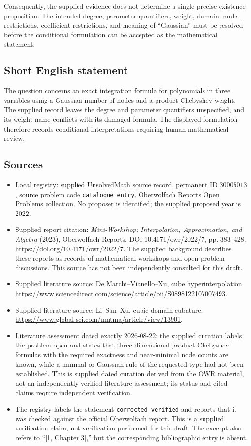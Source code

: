 \documentclass[11pt]{article}
\begin{document}
Consequently, the supplied evidence does not determine a single precise existence proposition. The intended degree, parameter quantifiers, weight, domain, node restrictions, coefficient restrictions, and meaning of ``Gaussian'' must be resolved before the conditional formulation can be accepted as the mathematical statement.
\subsection{Short English statement}
The question concerns an exact integration formula for polynomials in three variables using a Gaussian number of nodes and a product Chebyshev weight. The supplied record leaves the degree and parameter quantifiers unspecified, and its weight name conflicts with its damaged formula. The displayed formulation therefore records conditional interpretations requiring human mathematical review.
\subsection{Sources}
\begin{itemize}
\item Local registry: supplied UnsolvedMath source record, permanent ID \(30005013\), source problem code \texttt{catalogue entry}, Oberwolfach Reports Open Problems collection. No proposer is identified; the supplied proposed year is 2022.
\item Supplied report citation: \emph{Mini-Workshop: Interpolation, Approximation, and Algebra} (2023), Oberwolfach Reports, DOI 10.4171/owr/2022/7, pp. 383--428. \url{https://doi.org/10.4171/owr/2022/7}. The supplied background describes these reports as records of mathematical workshops and open-problem discussions. This source has not been independently consulted for this draft.
\item Supplied literature source: De Marchi--Vianello--Xu, cube hyperinterpolation. \url{https://www.sciencedirect.com/science/article/pii/S0898122107007493}.
\item Supplied literature source: Li--Sun--Xu, cubic-domain cubature. \url{https://www.global-sci.com/nmtma/article/view/13901}.
\item Literature assessment dated exactly 2026-08-22: the supplied curation labels the problem open and states that three-dimensional product-Chebyshev formulas with the required exactness and near-minimal node counts are known, while a minimal or Gaussian rule of the requested type had not been established. This is supplied dated curation derived from the OWR material, not an independently verified literature assessment; its status and cited claims require independent verification.
\item The registry labels the statement \texttt{corrected\_verified} and reports that it was checked against the official Oberwolfach report. This is a supplied verification claim, not verification performed for this draft. The excerpt also refers to ``[1, Chapter 3],'' but the corresponding bibliographic entry is absent.
\end{itemize}
\end{document}
